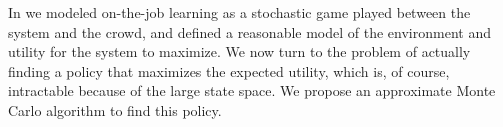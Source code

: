 In  we modeled on-the-job learning as a stochastic game played between the system and the crowd, and defined a reasonable model of the environment and utility for the system to maximize.
We now turn to the problem of actually finding a policy that maximizes the expected utility,
which is, of course, intractable because of the large state space.
We propose an approximate Monte Carlo algorithm to find this policy. 




